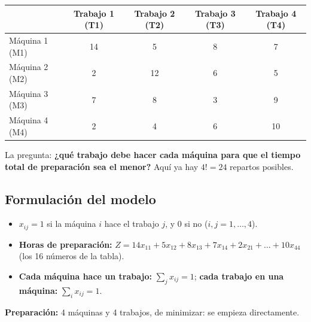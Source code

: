 \documentclass[11pt,a4paper]{article}
\begin{document}
\begin{center}\small
\begin{tabular}{lcccc}
\toprule
 & \textbf{Trabajo 1 (T1)} & \textbf{Trabajo 2 (T2)} & \textbf{Trabajo 3 (T3)} & \textbf{Trabajo 4 (T4)} \\
\midrule
Máquina 1 (M1) & 14 & 5  & 8 & 7 \\
Máquina 2 (M2) & 2  & 12 & 6 & 5 \\
Máquina 3 (M3) & 7  & 8  & 3 & 9 \\
Máquina 4 (M4) & 2  & 4  & 6 & 10 \\
\bottomrule
\end{tabular}
\end{center}

La pregunta: \textbf{¿qué trabajo debe hacer cada máquina para que el tiempo total de preparación sea el menor?}
Aquí ya hay $4! = 24$ repartos posibles.

\subsection*{Formulación del modelo}
\begin{itemize}[itemsep=2pt]
  \item $x_{ij} = 1$ si la máquina $i$ hace el trabajo $j$, y $0$ si no ($i, j = 1, \dots, 4$).
  \item \textbf{Horas de preparación:} $Z = 14x_{11} + 5x_{12} + 8x_{13} + 7x_{14} + 2x_{21} + \dots + 10x_{44}$
        (los 16 números de la tabla).
  \item \textbf{Cada máquina hace un trabajo:} $\sum_j x_{ij} = 1$; \quad \textbf{cada trabajo en una máquina:}
        $\sum_i x_{ij} = 1$.
\end{itemize}
\textbf{Preparación:} 4 máquinas y 4 trabajos, de minimizar: se empieza directamente.
\end{document}
